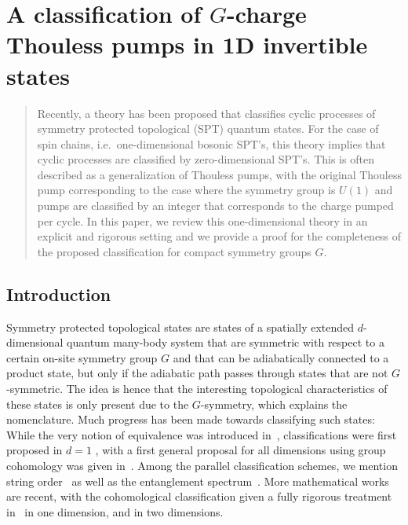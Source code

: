 \chapter{A classification of $G$-charge Thouless pumps in 1D invertible states}\label{ch:LoopSPT}
\begin{abstract} Recently, a theory has been proposed that classifies cyclic processes of symmetry protected topological (SPT) quantum states.  For the case of spin chains, i.e.\ one-dimensional bosonic SPT's, this theory implies that cyclic processes are classified by zero-dimensional SPT's. This is often described as a generalization of Thouless pumps, with the original Thouless pump corresponding to the case where the symmetry group is $U(1)$ and pumps are classified by an integer that corresponds to the charge pumped per cycle. 
	In this paper, we review this one-dimensional theory in an explicit and rigorous setting and we provide a proof for the completeness of the proposed classification for compact symmetry groups $G$. 
\end{abstract}



\section{Introduction}   \label{sec: introduction}

Symmetry protected topological states are states of a spatially extended $d$-dimensional quantum many-body system that are symmetric with respect to a certain on-site symmetry group $G$ and that can be adiabatically connected to a product state, but only if the adiabatic path passes through states that are not $G$-symmetric. The idea is hence that the interesting topological characteristics of these states is only present due to the $G$-symmetry, which explains the nomenclature. Much progress has been made towards classifying such states: While the very notion of equivalence was introduced in~\cite{chen2010local}, classifications were first proposed in $d=1$ \cite{chen_gu_wen_2011,schuch2011classifying,pollmann2012symmetry}, with a first general proposal for all dimensions using group cohomology was given in~\cite{chen2013symmetry}. Among the parallel classification schemes, we mention string order~\cite{nijs:1989a,perez2008string} as well as the entanglement spectrum~\cite{li2008entanglement,pollmann2010entanglement}. More mathematical works are recent, with the cohomological classification given a fully rigorous treatment in~\cite{OgataZ2,ogata2021classification,kapustin2021classification} in one dimension, and \cite{Ogata2d,sopenko2021index} in two dimensions.  

